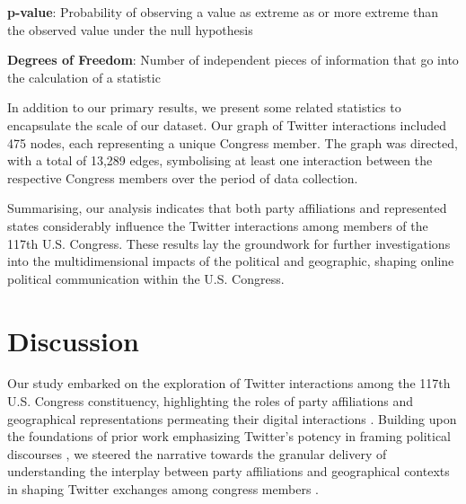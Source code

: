 \documentclass[11pt]{article}
\begin{document}
\begin{table}[h]
\caption{Chi-square test of state-wise retweet interaction.}
\label{table:state_wise_interaction}
\begin{threeparttable}
\renewcommand{\TPTminimum}{\linewidth}
\begin{tablenotes}
\footnotesize
\item \textbf{p-value}: Probability of observing a value as extreme as or more extreme than the observed value under the null hypothesis
\item \textbf{Degrees of Freedom}: Number of independent pieces of information that go into the calculation of a statistic
\end{tablenotes}
\end{threeparttable}
\end{table}


In addition to our primary results, we present some related statistics to encapsulate the scale of our dataset. Our graph of Twitter interactions included 475 nodes, each representing a unique Congress member. The graph was directed, with a total of 13,289 edges, symbolising at least one interaction between the respective Congress members over the period of data collection. 

Summarising, our analysis indicates that both party affiliations and represented states considerably influence the Twitter interactions among members of the 117th U.S. Congress. These results lay the groundwork for further investigations into the multidimensional impacts of the political and geographic, shaping online political communication within the U.S. Congress.

\section*{Discussion}

Our study embarked on the exploration of Twitter interactions among the 117th U.S. Congress constituency, highlighting the roles of party affiliations and geographical representations permeating their digital interactions \cite{Sun2018ATPDG, Hu2020OpenGB}. Building upon the foundations of prior work emphasizing Twitter's potency in framing political discourses \cite{Muragod2018TheSM, Stier2018ElectionCO}, we steered the narrative towards the granular delivery of understanding the interplay between party affiliations and geographical contexts in shaping Twitter exchanges among congress members \cite{An2019PoliticalDI}.
\end{document}
